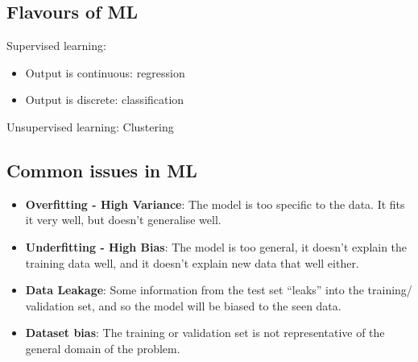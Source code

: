 \documentclass{article}
\renewcommand{\|}{\,\,|\,\,}
\begin{document}
\subsection{Flavours of ML}
Supervised learning:
\begin{itemize}
\item Output is continuous: regression
\item Output is discrete: classification
\end{itemize}

Unsupervised learning: Clustering
\subsection{Common issues in ML}
\begin{itemize}
\item \textbf{Overfitting - High Variance}: The model is too specific to the
  data. It fits it very well, but doesn't generalise well.
\item \textbf{Underfitting - High Bias}: The model is too general, it doesn't
  explain the training data well, and it doesn't explain new data that well either.
\item \textbf{Data Leakage}: Some information from the test set ``leaks'' into
  the training/ validation set, and so the model will be biased to the seen data.
\item \textbf{Dataset bias}: The training or validation set is not
  representative of the general domain of the problem. 
\end{itemize}
\end{document}
